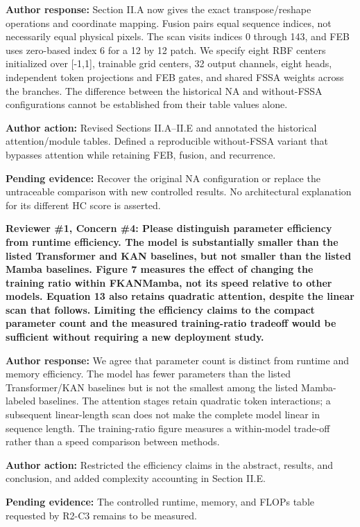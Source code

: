 \documentclass[a4paper,onecolumn,11pt]{IEEEtran}
\newcommand{\pending}[1]{\par\noindent\textcolor{red!70!black}{\textbf{Pending evidence:} #1}\par}
\begin{document}
\textbf{Author response:}
Section II.A now gives the exact transpose/reshape operations and coordinate mapping. Fusion pairs equal sequence indices, not necessarily equal physical pixels. The scan visits indices 0 through 143, and FEB uses zero-based index 6 for a 12 by 12 patch. We specify eight RBF centers initialized over [-1,1], trainable grid centers, 32 output channels, eight heads, independent token projections and FEB gates, and shared FSSA weights across the branches. The difference between the historical NA and without-FSSA configurations cannot be established from their table values alone.

\textbf{Author action:}
Revised Sections II.A--II.E and annotated the historical attention/module tables. Defined a reproducible without-FSSA variant that bypasses attention while retaining FEB, fusion, and recurrence. \pending{Recover the original NA configuration or replace the untraceable comparison with new controlled results. No architectural explanation for its different HC score is asserted.}

\vspace{1.5em}
{\color{reviewgreen}\textbf{Reviewer \#1, Concern \#4: Please distinguish parameter efficiency from runtime efficiency. The model is substantially smaller than the listed Transformer and KAN baselines, but not smaller than the listed Mamba baselines. Figure 7 measures the effect of changing the training ratio within FKANMamba, not its speed relative to other models. Equation 13 also retains quadratic attention, despite the linear scan that follows. Limiting the efficiency claims to the compact parameter count and the measured training-ratio tradeoff would be sufficient without requiring a new deployment study. }}

\textbf{Author response:}
We agree that parameter count is distinct from runtime and memory efficiency. The model has fewer parameters than the listed Transformer/KAN baselines but is not the smallest among the listed Mamba-labeled baselines. The attention stages retain quadratic token interactions; a subsequent linear-length scan does not make the complete model linear in sequence length. The training-ratio figure measures a within-model trade-off rather than a speed comparison between methods.

\textbf{Author action:}
Restricted the efficiency claims in the abstract, results, and conclusion, and added complexity accounting in Section II.E. \pending{The controlled runtime, memory, and FLOPs table requested by R2-C3 remains to be measured.}
\end{document}
